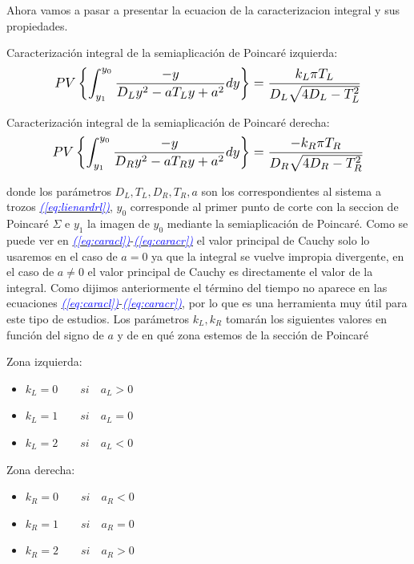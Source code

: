\documentclass[12pt,a4paper]{report} %
\newcommand{\eref}[1]{\hyperref[#1]{\textcolor{blue}{\textit{(\ref*{#1})}}}}
\begin{document}
	\vspace{0.5cm}\noindent Ahora vamos a pasar a presentar la ecuacion de la caracterizacion integral y sus propiedades.
	
	\vspace{0.5cm}\noindent Caracterización integral de la semiaplicación de Poincaré izquierda:
	\begin{equation}
		\label{eq:caracl}
		\scalebox{1.2}{$\displaystyle
		PV\left\{\int_{y_1}^{y_0}\frac{-y}{D_Ly^2-aT_Ly+a^2}dy\right\}=\frac{k_L\pi T_L}{D_L\sqrt{4D_L-T_L^2}}
		$}
	\end{equation}\smallskip
	
	\vspace{0.5cm}\noindent Caracterización integral de la semiaplicación de Poincaré derecha:
	\begin{equation}
		\label{eq:caracr}
		\scalebox{1.2}{$\displaystyle
			PV\left\{\int_{y_1}^{y_0}\frac{-y}{D_Ry^2-aT_Ry+a^2}dy\right\}=\frac{-k_R\pi T_R}{D_R\sqrt{4D_R-T_R^2}}
			$}
	\end{equation}\smallskip
	
	\noindent donde los parámetros $D_L,T_L,D_R,T_R,a$ son los correspondientes al sistema a trozos \eref{eq:lienardrl}, $y_0$ corresponde al primer punto de corte con la seccion de Poincaré $\varSigma$ e $y_1$ la imagen de $y_0$ mediante la semiaplicación de Poincaré. Como se puede ver en \eref{eq:caracl}-\eref{eq:caracr} el valor principal de Cauchy solo lo usaremos en el caso de $a=0$ ya que la integral se vuelve impropia divergente, en el caso de $a\neq0$ el valor principal de Cauchy es directamente el valor de la integral. Como dijimos anteriormente el término del tiempo no aparece en las ecuaciones \eref{eq:caracl}-\eref{eq:caracr}, por lo que es una herramienta muy útil para este tipo de estudios. Los parámetros $k_L,k_R$ tomarán los siguientes valores en función del signo de $a$ y de en qué zona estemos de la sección de Poincaré
	
	\vspace{0.5cm}\noindent Zona izquierda:
	\begin{itemize}
		\item $k_L=0 \qquad si \quad a_L>0$
		\item $k_L=1 \qquad si \quad a_L=0$
		\item $k_L=2 \qquad si \quad a_L<0$
	\end{itemize}\smallskip
	
		\noindent Zona derecha:
	\begin{itemize}
		\item $k_R=0 \qquad si \quad a_R<0$
		\item $k_R=1 \qquad si \quad a_R=0$
		\item $k_R=2 \qquad si \quad a_R>0$
	\end{itemize}\smallskip
	\newpage
	
\end{document}
